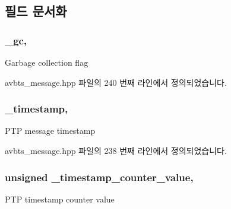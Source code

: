 \subsection{필드 문서화}
\subsubsection[{\texorpdfstring{\+\_\+gc}{_gc}}]{ \+\_\+gc\hspace{0.3cm}{\ttfamily [protected]}, {\ttfamily [inherited]}}\hypertarget{class_p_t_p_message_common_a1b15d1687680708819ead19f82a970a9}{}\label{class_p_t_p_message_common_a1b15d1687680708819ead19f82a970a9}
Garbage collection flag 

avbts\+\_\+message.\+hpp 파일의 240 번째 라인에서 정의되었습니다.

\subsubsection[{\texorpdfstring{\+\_\+timestamp}{_timestamp}}]{ \+\_\+timestamp\hspace{0.3cm}{\ttfamily [protected]}, {\ttfamily [inherited]}}\hypertarget{class_p_t_p_message_common_aeafd115d5626f0602ab067a502d83d3e}{}\label{class_p_t_p_message_common_aeafd115d5626f0602ab067a502d83d3e}
P\+TP message timestamp 

avbts\+\_\+message.\+hpp 파일의 238 번째 라인에서 정의되었습니다.

\subsubsection[{\texorpdfstring{\+\_\+timestamp\+\_\+counter\+\_\+value}{_timestamp_counter_value}}]{\setlength{\rightskip}{0pt plus 5cm}unsigned \+\_\+timestamp\+\_\+counter\+\_\+value\hspace{0.3cm}{\ttfamily [protected]}, {\ttfamily [inherited]}}\hypertarget{class_p_t_p_message_common_a9d90ca571f84fe3633c7539e24783190}{}\label{class_p_t_p_message_common_a9d90ca571f84fe3633c7539e24783190}
P\+TP timestamp counter value 

